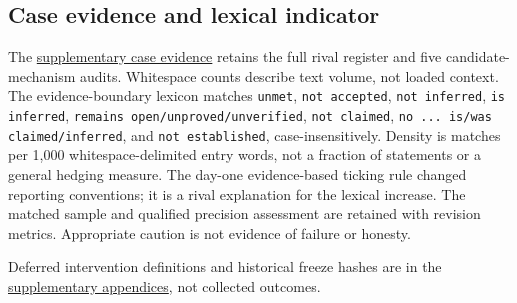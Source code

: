 \subsection{Case evidence and lexical indicator}\label{app:lexicalindicator}

The \hyperref[sec:supplement]{supplementary case evidence} retains the full
rival register and five candidate-mechanism audits.
Whitespace counts describe text volume, not loaded context.
The evidence-boundary lexicon matches
\texttt{unmet}, \texttt{not accepted}, \texttt{not inferred},
\texttt{is inferred}, \texttt{remains open/unproved/unverified},
\texttt{not claimed}, \texttt{no ... is/was claimed/inferred}, and
\texttt{not established}, case-insensitively.
Density is matches per 1,000 whitespace-delimited entry words, not a
fraction of statements or a general hedging measure.
The day-one evidence-based ticking rule changed reporting conventions;
it is a rival explanation for the lexical increase. The matched sample
and qualified precision assessment are retained with revision metrics.
Appropriate caution is not evidence of failure or honesty.

Deferred intervention definitions and historical freeze hashes are in
the \hyperref[sec:supplement]{supplementary appendices}, not collected outcomes.
